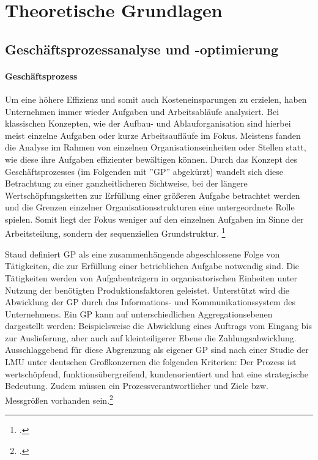 \chapter{Theoretische Grundlagen}


\section{Geschäftsprozessanalyse und -optimierung}

\subsubsection{Geschäftsprozess}\label{sec:Kapitel211}

Um eine höhere Effizienz und somit auch Kosteneinsparungen  zu erzielen, haben Unternehmen immer wieder Aufgaben und Arbeitsabläufe analysiert. Bei klassischen Konzepten, wie der Aufbau- und Ablauforganisation sind hierbei meist einzelne Aufgaben oder kurze Arbeitsaufläufe im Fokus. Meistens fanden die Analyse im Rahmen von einzelnen Organisationseinheiten oder Stellen statt, wie diese ihre Aufgaben effizienter bewältigen können. Durch das Konzept des Geschäftsprozesses (im Folgenden mit ''GP'' abgekürzt) wandelt sich diese Betrachtung zu einer ganzheitlicheren Sichtweise, bei der längere Wertschöpfungsketten zur Erfüllung einer grö\ss eren Aufgabe betrachtet werden und die Grenzen einzelner Organisationsstrukturen eine untergeordnete Rolle spielen. Somit liegt der Fokus weniger auf den einzelnen Aufgaben im Sinne der Arbeitsteilung, sondern der sequenziellen Grundstruktur. \footcite[Vgl.][S. 5]{theorie_staud_geschäftsprozessanalyse_2006}

Staud definiert GP als eine zusammenhängende abgeschlossene Folge von Tätigkeiten, die zur Erfüllung einer betrieblichen Aufgabe notwendig sind. Die Tätigkeiten werden von Aufgabenträgern in organisatorischen Einheiten unter Nutzung der benötigten Produktionsfaktoren geleistet. Unterstützt wird die Abwicklung der GP durch das Informations- und Kommunikationssystem des Unternehmens. \parencite[Vgl.][S. 9]{theorie_staud_geschäftsprozessanalyse_2006} Ein GP kann auf unterschiedlichen Aggregationsebenen dargestellt werden: Beispielsweise die Abwicklung eines Auftrags vom Eingang bis zur Auslieferung, aber auch auf kleinteiligerer Ebene die Zahlungsabwicklung. Ausschlaggebend für diese Abgrenzung als eigener GP sind nach einer Studie der LMU unter deutschen Gro\ss konzernen die folgenden Kriterien: Der Prozess ist wertschöpfend, funktionsübergreifend, kundenorientiert und hat eine strategische Bedeutung. Zudem müssen ein Prozessverantwortlicher und Ziele bzw. Messgrö\ss en vorhanden sein.\footcite[Vgl.][S. 19]{theorie_koch_studie_kriterien_geschäftsprozess_2003} 

